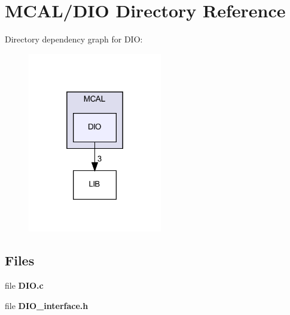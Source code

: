 \section{M\+C\+A\+L/\+D\+IO Directory Reference}
\label{dir_8439cbf7440b5bdef3b055efe8d89058}
Directory dependency graph for D\+IO\+:\nopagebreak
\begin{figure}[H]
\begin{center}
\leavevmode
\includegraphics[width=166pt]{dir_8439cbf7440b5bdef3b055efe8d89058_dep}
\end{center}
\end{figure}
\subsection*{Files}
\begin{DoxyCompactItemize}
\item 
file \textbf{ D\+I\+O.\+c}
\item 
file \textbf{ D\+I\+O\+\_\+interface.\+h}
\end{DoxyCompactItemize}
